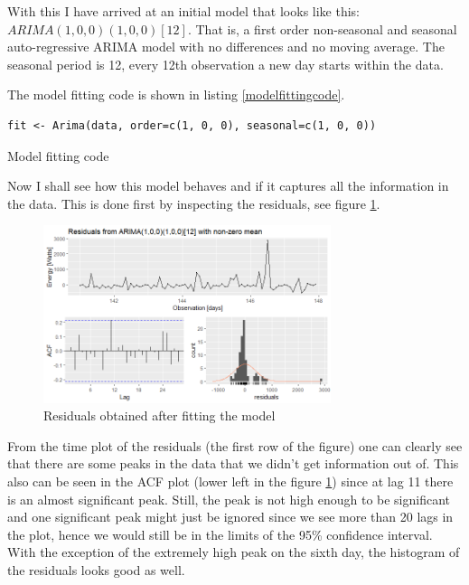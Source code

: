 \documentclass[12pt,a4paper,titlepage]{report}
\begin{document}
With this I have arrived at an initial model that looks like this: $ ARIMA(1, 0, 0)(1, 0, 0)[12] $. That is, a first order non-seasonal and seasonal auto-regressive ARIMA model with no differences and no moving average. The seasonal period is 12, every 12th observation a new day starts within the data.

The model fitting code is shown in listing \ref{modelfittingcode}.

\begin{listing}[h]
    \begin{verbatim}
fit <- Arima(data, order=c(1, 0, 0), seasonal=c(1, 0, 0))
    \end{verbatim}
    
    \caption{Model fitting code}
    \label{modelfittingcode}
\end{listing}

Now I shall see how this model behaves and if it captures all the information in the data. This is done first by inspecting the residuals, see figure \ref{dlastweek2hrsph3residuals}.

\begin{figure}[h]
    \centering
    \includegraphics[width=0.75\textwidth]{dlastweek2hrsph3residuals}
    \caption{Residuals obtained after fitting the model}
    \label{dlastweek2hrsph3residuals}
\end{figure}

From the time plot of the residuals (the first row of the figure) one can clearly see that there are some peaks in the data that we didn't get information out of. This also can be seen in the ACF plot (lower left in the figure \ref{dlastweek2hrsph3residuals}) since at lag 11 there is an almost significant peak. Still, the peak is not high enough to be significant and one significant peak might just be ignored since we see more than 20 lags in the plot, hence we would still be in the limits of the 95\% confidence interval. With the exception of the extremely high peak on the sixth day, the histogram of the residuals looks good as well. 
\end{document}
